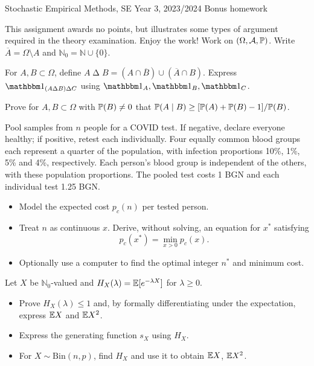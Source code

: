 \documentclass[a4paper]{report}
\begin{document}
\noindent Stochastic Empirical Methods, SE Year 3, 2023/2024 \hfill Bonus homework
\hrulefill
\begin{it}This assignment awards no points, but illustrates some types of argument required in the theory examination. Enjoy the work! Work on $(\Omega,\mathcal A,\P)$. Write $\overline A=\Omega\setminus A$ and $\mathbb N_0=\mathbb N\cup\{0\}$.\end{it}
\begin{problem}
For $A,B\subset\Omega$, define $A\mathbin\Delta B=(A\cap\overline B)\cup(\overline A\cap B)$. Express $\mathbbm1_{(A\Delta B)\Delta C}$ using $\mathbbm1_A,\mathbbm1_B,\mathbbm1_C$.
\end{problem}
\begin{problem}
Prove for $A,B\subset\Omega$ with $\P(B)\ne0$ that $\P(A\mid B)\geq[\P(A)+\P(B)-1]/\P(B)$.
\end{problem}
\begin{problem}
Pool samples from $n$ people for a COVID test. If negative, declare everyone healthy; if positive, retest each individually. Four equally common blood groups each represent a quarter of the population, with infection proportions 10\%, 1\%, 5\% and 4\%, respectively. Each person's blood group is independent of the others, with these population proportions. The pooled test costs 1 BGN and each individual test 1.25 BGN.
\begin{itemize}
\item Model the expected cost $p_c(n)$ per tested person.
\item Treat $n$ as continuous $x$. Derive, without solving, an equation for $x^*$ satisfying \[p_c(x^*)=\min_{x>0}p_c(x).\]
\item Optionally use a computer to find the optimal integer $n^*$ and minimum cost.
\end{itemize}
\end{problem}
\begin{problem}
Let $X$ be $\mathbb N_0$-valued and $H_X(\lambda)=\E[e^{-\lambda X}]$ for $\lambda\geq0$.
\begin{itemize}
\item Prove $H_X(\lambda)\leq1$ and, by formally differentiating under the expectation, express $\E X$ and $\E X^2$.
\item Express the generating function $s_X$ using $H_X$.
\item For $X\sim\mathrm{Bin}(n,p)$, find $H_X$ and use it to obtain $\E X$, $\E X^2$.
\end{itemize}
\end{problem}
\end{document}

